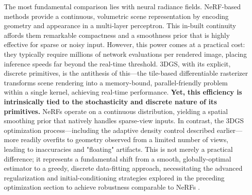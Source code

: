 \documentclass[11pt,a4paper]{article}
\begin{document}
The most fundamental comparison lies with neural radiance fields. NeRF-based methods \cite{arxiv:2205.10824v2} provide a continuous, volumetric scene representation by encoding geometry and appearance in a multi-layer perceptron. This in-built continuity affords them remarkable compactness and a smoothness prior that is highly effective for sparse or noisy input. However, this power comes at a practical cost: they typically require millions of network evaluations per rendered image, placing inference speeds far beyond the real-time threshold. 3DGS, with its explicit, discrete primitives, is the antithesis of this---the tile-based differentiable rasterizer transforms scene rendering into a memory-bound, parallel-friendly problem within a single kernel, achieving real-time performance. \textbf{Yet, this efficiency is intrinsically tied to the stochasticity and discrete nature of its primitives.} NeRFs operate on a continuous distribution, yielding a spatial smoothing prior that natively handles sparse-view inputs. In contrast, the 3DGS optimization process---including the adaptive density control described earlier---more readily overfits to geometry observed from a limited number of views, leading to inaccuracies and "floating" artifacts. This is not merely a practical difference; it represents a fundamental shift from a smooth, globally-optimal estimator to a greedy, discrete data-fitting approach, necessitating the advanced regularization and initial-conditioning strategies explored in the preceding optimization section to achieve robustness comparable to NeRFs \cite{arxiv:2311.17910v1,arxiv:2403.08498v1}.
\end{document}
